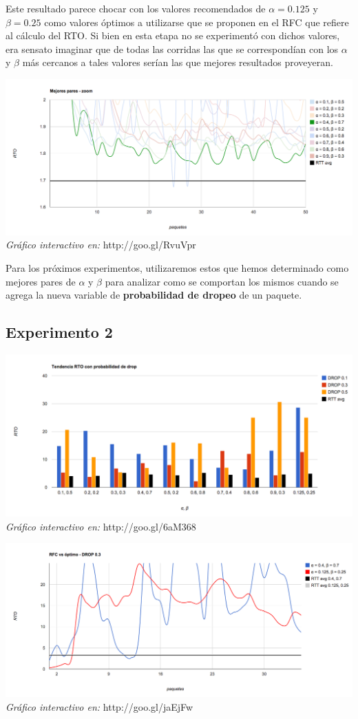 \indent Este resultado parece chocar con los valores recomendados de $\alpha = 0.125$  y $\beta = 0.25$ como valores óptimos a utilizarse que se proponen en el RFC que refiere al cálculo del RTO. Si bien en esta etapa no se experimentó con dichos valores, era sensato imaginar que de todas las corridas las que se correspondían con los $\alpha$ y $\beta$ más cercanos a tales valores serían las que mejores resultados proveyeran.\\

\begin{center}
	\includegraphics[scale=0.35]{graphics/best_pairs_zoom.png}
	\textit{Gráfico interactivo en:} http://goo.gl/RvuVpr
\end{center}

Para los próximos experimentos, utilizaremos estos que hemos determinado como mejores pares de $\alpha$ y $\beta$ para analizar como se comportan los mismos cuando se agrega la nueva variable de \textbf{probabilidad de dropeo} de un paquete.

\subsection{Experimento 2}

\begin{center}
	\includegraphics[scale=0.35]{graphics/tendencia_RTO_drop.png}
	\textit{Gráfico interactivo en:} http://goo.gl/6aM368
\end{center}

\begin{center}
	\includegraphics[scale=0.35]{graphics/rfc_vs_optimo.png}
	\textit{Gráfico interactivo en:} http://goo.gl/jaEjFw
\end{center}
